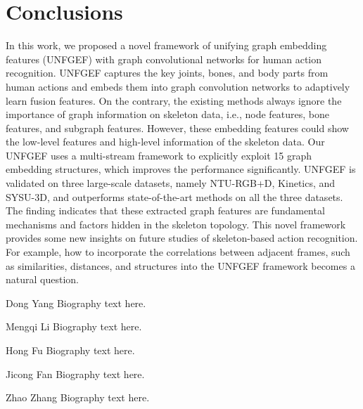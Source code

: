 \documentclass[journal]{IEEEtran}
\begin{document}
\section{Conclusions}

In this work, we proposed a novel framework of unifying graph embedding features (UNFGEF) with graph convolutional networks for human action recognition. UNFGEF captures the key joints, bones, and body parts from human actions and embeds them into graph convolution networks to adaptively learn fusion features. On the contrary, the existing methods always ignore the importance of graph information on skeleton data, i.e., node features, bone features, and subgraph features. However, these embedding features could show the low-level features and high-level information of the skeleton data. Our UNFGEF uses a multi-stream framework to explicitly exploit 15 graph embedding structures, which improves the performance significantly. UNFGEF is validated on three large-scale datasets, namely NTU-RGB+D, Kinetics, and SYSU-3D, and outperforms state-of-the-art methods on all the three datasets. The finding indicates that these extracted graph features are fundamental mechanisms and factors hidden in the skeleton topology. This novel framework provides some new insights on future studies of skeleton-based action recognition. For example, how to incorporate the correlations between adjacent frames, such as similarities, distances, and structures into the UNFGEF framework becomes a natural question.












\ifCLASSOPTIONcaptionsoff
  \newpage
\fi














\begin{IEEEbiography}{Dong Yang}
Biography text here.
\end{IEEEbiography}

\begin{IEEEbiographynophoto}{Mengqi Li}
Biography text here.
\end{IEEEbiographynophoto}



\begin{IEEEbiographynophoto}{Hong Fu}
Biography text here.
\end{IEEEbiographynophoto}

\begin{IEEEbiographynophoto}{Jicong Fan}
Biography text here.
\end{IEEEbiographynophoto}

\begin{IEEEbiographynophoto}{Zhao Zhang}
Biography text here.
\end{IEEEbiographynophoto}
\end{document}

